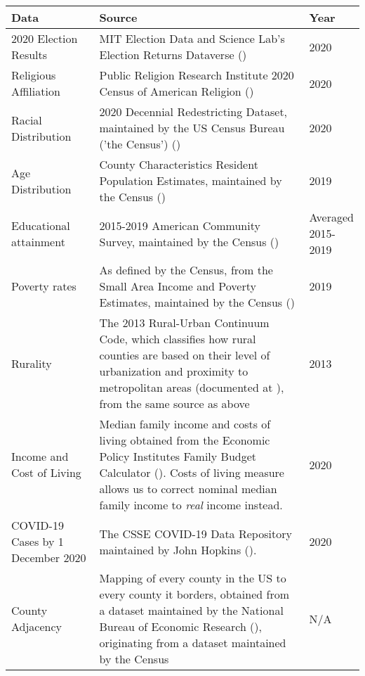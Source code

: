 \begin{minipage}{6.5in}
	\centering
	\def\sym#1{\ifmmode^{#1}\else\(^{#1}\)\fi}
	\def\arraystretch{1.1}
	\small
	\begin{tabular*}{\textwidth}{@{\extracolsep{\fill}}p{0.25\linewidth}p{0.6\linewidth}p{0.15\linewidth}}
		\hline\hline
		Data&Source&Year\\
		\hline
		2020 Election Results&MIT Election Data and Science Lab's Election Returns Dataverse (\cite{mit_election_data_and_science_lab_county_2022})&2020\\
		Religious Affiliation&Public Religion Research Institute 2020 Census of American Religion (\cite{prri_2020_2020})&2020\\
		Racial Distribution&2020 Decennial Redestricting Dataset, maintained by the US Census Bureau ('the Census') (\cite{census_p1_2020})&2020\\
		Age Distribution&County Characteristics Resident Population Estimates, maintained by the Census (\cite{census_county_2019})&2019\\
		Educational attainment&2015-2019 American Community Survey, maintained by the Census (\cite{usda_ers_usda_2019})& Averaged 2015-2019\\
		Poverty rates&As defined by the Census, from the Small Area Income and Poverty Estimates, maintained by the Census (\cite{usda_ers_usda_2019})&2019\\
		Rurality&The 2013 Rural-Urban Continuum Code, which classifies how rural counties are based on their level of urbanization and proximity to metropolitan areas (documented at \citet{usda_ers_usda_2019-1}), from the same source as above&2013\\
		Income and Cost of Living&Median family income and costs of living obtained from the Economic Policy Institutes Family Budget Calculator (\cite{epi_family_2020}). Costs of living measure allows us to correct nominal median family income to \textit{real} income instead.&2020\\
		COVID-19 Cases by 1 December 2020&The CSSE COVID-19 Data Repository maintained by John Hopkins (\cite{cssegis_covid-19_2022}).&2020\\
		County Adjacency&Mapping of every county in the US to every county it borders, obtained from a dataset maintained by the National Bureau of Economic Research (\cite{nber_county_2010}), originating from a dataset maintained by the Census&N/A\\
		\hline\hline
	\end{tabular*}

\end{minipage}
